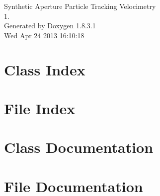 \documentclass{book}
\begin{document}
\hypersetup{pageanchor=false,citecolor=blue}
\begin{titlepage}
\vspace*{7cm}
\begin{center}
{\Large Synthetic Aperture Particle Tracking Velocimetry \\[1ex]\large 1. }\\
\vspace*{1cm}
{\large Generated by Doxygen 1.8.3.1}\\
\vspace*{0.5cm}
{\small Wed Apr 24 2013 16:10:18}\\
\end{center}
\end{titlepage}
\clearemptydoublepage
{}
\tableofcontents
\clearemptydoublepage
{}
\hypersetup{pageanchor=true,citecolor=blue}
\chapter{Class Index}

\chapter{File Index}

\chapter{Class Documentation}















\chapter{File Documentation}



















\printindex
\end{document}

